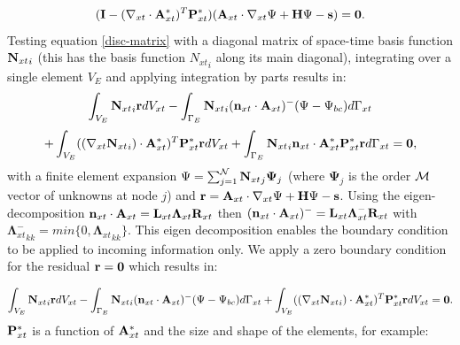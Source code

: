 \begin{equation}
 ({\bf I}- ({\nabla_{xt}} \cdot{{\bf A}_{xt}^*})^T {\bf P}_{xt}^* )({\bf A}_{xt} \cdot {\nabla_{xt}} \Psi +{\bf H}  \Psi -{\bf s})={\bf 0}. 
\label{disc-matrix} 
\end{equation}
 Testing equation \ref{disc-matrix} with a diagonal matrix of 
 space-time basis function ${{\bf N}_{xt}}_i$ (this has the basis 
 function ${N_{xt}}_i$ along
its main diagonal),  
 integrating over a single element $V_E$ and applying integration 
 by parts results in: 
\begin{equation}
 \int_{V_E} 
 {{\bf N}_{xt}}_i {\bf r} d V_{xt} - \int_{\Gamma_E} {{\bf N}_{xt}}_i 
 ({\bf n}_{xt}\cdot{{\bf A}_{xt}} )^- (\Psi-\Psi_{bc}) d \Gamma_{xt} 
\label{disc2-matrix-1} 
\end{equation}
\begin{equation}
 +
 \int_{V_E} (({\nabla_{xt}} {{\bf N}_{xt}}_i ) \cdot{{\bf A}_{xt}^*})^T {\bf P}_{xt}^*  {\bf r} d V_{xt} 
 +\int_{\Gamma_E} {{\bf N}_{xt}}_i {\bf n}_{xt}\cdot{{\bf A}_{xt}^*}  {\bf P}_{xt}^* {\bf r}  d \Gamma_{xt} 
 ={\bf 0}, 
\label{disc2-matrix-2} 
\end{equation}
 with a finite element expansion $\Psi=\sum_{j=1}^{\cal N} {{\bf N}_{xt}}_j 
 {\mathbf \Psi}_j$ (where ${\mathbf \Psi}_j$ is the order $\cal M$ vector of 
 unknowns at node $j$) 
 and ${\bf r}={\bf A}_{xt} \cdot {\nabla_{xt}} \Psi +{\bf H} \Psi -{\bf s}$. 
 Using the eigen-decomposition 
 ${\bf n}_{xt}\cdot{{\bf A}_{xt}}={\bf L}_{xt} {\mathbf \Lambda}_{xt} {\bf R}_{xt}$ then
 $({\bf n}_{xt}\cdot{{\bf A}_{xt}})^-={\bf L}_{xt} {\mathbf \Lambda}_{xt}^- {\bf R}_{xt}$  
 with ${{\mathbf \Lambda}_{xt}^-}_{kk} = min\{ 0, {{\mathbf \Lambda}_{xt}}_{kk} \}$. This eigen 
 decomposition enables the boundary condition to be applied to incoming 
 information only. 
   We apply a zero boundary 
 condition for the residual ${\bf r}={\bf 0}$ which results in: 
 
\begin{equation}
 \int_{V_E}
 {{\bf N}_{xt}}_i {\bf r} d V_{xt} 
 - \int_{\Gamma_E} {{\bf N}_{xt}}_i ({\bf n}_{xt}\cdot{{\bf A}_{xt}})^- (\Psi-\Psi_{bc}) 
 d \Gamma_{xt} 
 +
  \int_{V_E} (({\nabla_{xt}} {{\bf N}_{xt}}_i ) \cdot{{\bf A}_{xt}^*})^T {\bf P}_{xt}^*  {\bf r} d V_{xt} 
 ={\bf 0}.
\label{disc3-matrix} 
\end{equation}
 ${\bf P}^*_{xt}$ is a function of ${\bf A}^*_{xt}$ and the size and shape of the 
 elements, for example: 
 
